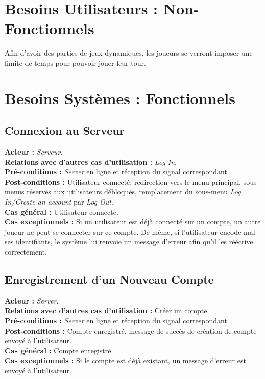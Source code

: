 \documentclass[10pt, a4paper]{article}
\begin{document}
\section{Besoins Utilisateurs : Non-Fonctionnels}
Afin d'avoir des parties de jeux dynamiques, les joueurs se verront imposer une limite de temps pour pouvoir jouer leur tour. \\

\section{Besoins Systèmes : Fonctionnels}

\subsection{Connexion au Serveur}
\textbf{Acteur :} \textit{Serveur}. \\
\textbf{Relations avec d'autres cas d'utilisation :} \textit{Log In}. \\
\textbf{Pré-conditions :} \textit{Server} en ligne et réception du signal correspondant. \\
\textbf{Post-conditions :} Utilisateur connecté, redirection vers le menu principal, sous-menus réservés aux utilisateurs débloqués, remplacement du sous-menu \textit{Log In/Create an account} par \textit{Log Out}. \\
\textbf{Cas général :} Utilisateur connecté. \\
\textbf{Cas exceptionnels :} Si un utilisateur est déjà connecté sur un compte, un autre joueur ne peut se connecter sur ce compte. De même, si l’utilisateur encode mal ses identifiants, le système lui renvoie un message d’erreur afin qu’il les réécrive correctement. \\

\subsection{Enregistrement d'un Nouveau Compte}
\textbf{Acteur :} \textit{Server}. \\
\textbf{Relations avec d'autres cas d'utilisation :} Créer un compte. \\
\textbf{Pré-conditions :} \textit{Server} en ligne et réception du signal correspondant. \\
\textbf{Post-conditions :} Compte enregistré, message de succès de création de compte envoyé à l'utilisateur. \\
\textbf{Cas général :} Compte enregistré. \\
\textbf{Cas exceptionnels :} Si le compte est déjà existant, un message d'erreur est envoyé à l'utilisateur. \\
\end{document}
